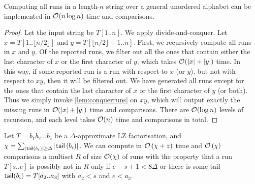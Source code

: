 \begin{lemma}
\label{lem:divideruns}
Computing all runs in a length-$n$ string over a general unordered alphabet can be implemented in $\mathcal{O}(n\log n)$ time and comparisons.
\end{lemma}

\begin{proof}
Let the input string be $T[1..n]$. We apply divide-and-conquer. Let $x=T[1..\lfloor n/2\rfloor]$ and $y=T[\lfloor n/2\rfloor + 1..n]$.
First, we recursively compute all runs in $x$ and $y$. Of the reported runs, we filter out all the ones that contain either the last character of $x$ or the first character of $y$, which takes $\mathcal{O}(\left\lvert x\right\rvert + \left\lvert y\right\rvert)$ time.
In this way, if some reported run is a run with respect to $x$ (or $y$), but not with respect to $xy$, then it will be filtered out.
We have generated all runs except for the ones that contain the last character of $x$ or the first character of $y$ (or both). Thus we simply invoke
\cref{lem:conquerruns} on $xy$, which will output exactly the missing runs in $\mathcal{O}(\left\lvert x\right\rvert + \left\lvert y\right\rvert)$ time and comparisons.
There are $\mathcal{O}(\log n)$ levels of recursion, and each level takes $\mathcal{O}(n)$ time and comparisons in total.
\end{proof}

\begin{lemma}
\label{lem:long:run}
Let $T = b_{1}b_{2}\ldots b_{z}$ be a $\Delta$-approximate LZ factorisation, and $\chi = \sum_{\left\lvert\textsf{tail}\left(b_{i}\right)\right\rvert \geq \Delta}\left\lvert\textsf{tail}\left(b_{i}\right)\right\rvert$.
We can compute in $\mathcal{O}\left(\chi + z\right)$ time and $\mathcal{O}\left(\chi\right)$ comparisons
a multiset $R$ of size $\mathcal{O}(\chi)$ of runs with the property that a run $T[s..e]$ is possibly not in $R$ only if $e-s+1 < 8\Delta$ or
there is some tail $\textsf{tail}(b_i) = T[a_2..a_3]$ with $a_2 < s$ and $e < a_3$.
\end{lemma}

